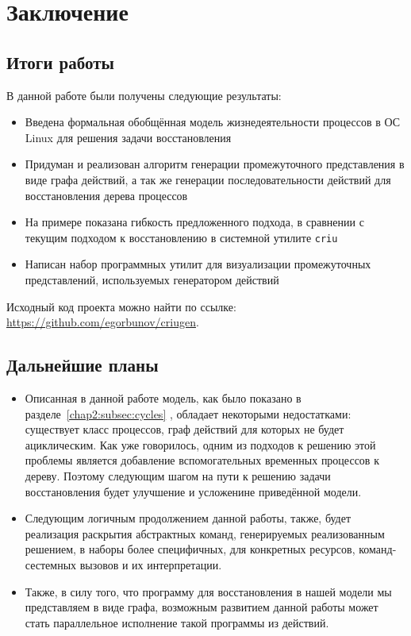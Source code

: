 

\chapter{Заключение}

\section{Итоги работы}

В данной работе были получены следующие результаты:

\begin{itemize}
	\item Введена формальная обобщённая модель жизнедеятельности процессов в ОС Linux для решения задачи восстановления
	\item Придуман и реализован алгоритм генерации промежуточного представления в виде графа действий, а так
	же генерации последовательности действий для восстановления дерева процессов
	\item На примере показана гибкость предложенного подхода, в сравнении с текущим подходом к восстановлению в системной утилите \texttt{criu}
	\item Написан набор программных утилит для визуализации промежуточных представлений, используемых генератором действий
\end{itemize}

Исходный код проекта можно найти по ссылке: \url{https://github.com/egorbunov/criugen}.

\section{Дальнейшие планы}

\begin{itemize}
	\item Описанная в данной работе модель, как было показано в разделе~\ref{chap2:subsec:cycles}
	, обладает некоторыми недостатками: существует класс процессов, граф действий для которых не 
	будет ациклическим. Как уже говорилось, одним из подходов к решению 
	этой проблемы является добавление вспомогательных временных процессов к дереву. Поэтому
	следующим шагом на пути к решению задачи восстановления будет улучшение и усложенине приведённой модели.
	\item Следующим логичным продолжением данной работы, также, будет реализация раскрытия абстрактных команд, генерируемых реализованным решением, в наборы более специфичных, для конкретных ресурсов, команд-сестемных вызовов и их интерпретации.
	\item Также, в силу того, что программу для восстановления в нашей модели мы представляем в виде графа, возможным развитием данной работы может стать параллельное исполнение такой программы из действий.
\end{itemize}
